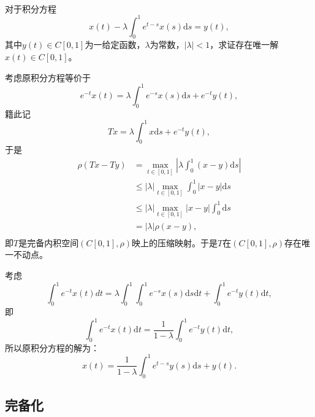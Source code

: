 \begin{exercise}
\hfill\\
对于积分方程
$$x(t)-\lambda\int_0^1e^{t-s}x(s)\mathrm{d}s=y(t),$$
其中$y(t)\in C[0,1]$为一给定函数，$\lambda$为常数，$|\lambda|<1$，求证存在唯一解$x(t)\in C[0,1]$。

考虑原积分方程等价于
$$e^{-t}x(t)=\lambda\int_0^1e^{-s}x(s)\mathrm{d}s+e^{-t}y(t),$$
籍此记
$$Tx=\lambda\int_0^1x\mathrm{d}s+e^{-t}y(t),$$
于是
\begin{align*}
\rho(Tx-Ty)&=\max_{t\in[0,1]}|\lambda\int_0^1(x-y)\mathrm{d}s|\\
&\leq|\lambda|\max_{t\in[0,1]}\int_0^1|x-y|\mathrm{d}s\\
&\leq|\lambda|\max_{t\in[0,1]}|x-y|\int_0^1\mathrm{d}s\\
&=|\lambda|\rho(x-y),\\
\end{align*}
即$T$是完备内积空间$(C[0,1],\rho)$映上的压缩映射。于是$T$在$(C[0,1],\rho)$存在唯一不动点。

考虑
$$\int_0^1e^{-t}x(t)dt=\lambda\int_0^1\int_0^1e^{-s}x(s)\mathrm{d}s\mathrm{d}t+\int_0^1e^{-t}y(t)\mathrm{d}t,$$
即
$$\int_0^1e^{-t}x(t)\mathrm{d}t=\frac{1}{1-\lambda}\int_0^1e^{-t}y(t)\mathrm{d}t,$$
所以原积分方程的解为：
$$x(t)=\frac{1}{1-\lambda}\int_0^1e^{t-s}y(s)\mathrm{d}s+y(t).$$
\end{exercise}

\subsection{完备化}

